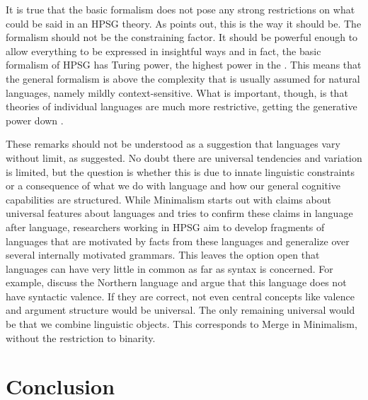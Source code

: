 \documentclass[output=paper
 	        ,biblatex
                ,babelshorthands
                ,newtxmath
                ,draftmode
                ,colorlinks, citecolor=brown
]{langscibook}
\begin{document}
It is true that
the basic formalism does not pose any strong restrictions on what could be said in an HPSG
theory. As \citet{Pollard97a} points out, this is the way it should be. The formalism should not be
the constraining factor. It should be powerful enough to allow everything to be expressed in
insightful ways and in fact, the basic formalism of HPSG has Turing power, the highest power in the
 \citep{Pollard99a}. This means that the general formalism is above the complexity that is usually
assumed for natural languages, namely mildly context-sensitive. What is important, though, is that theories of individual languages are much more
restrictive, getting the generative power down \citep[Chapter~17]{MuellerGT-Eng1}. 

These remarks should not be understood as a suggestion that languages vary without limit, as
\citet[]{Joos58a} suggested. No doubt there are universal tendencies and variation
is limited, but the question is whether this is due to innate linguistic constraints or a
consequence of what we do with language and how our general cognitive capabilities are structured. 
While Minimalism starts out with claims about universal features about languages and tries to
confirm these claims in language after language, researchers working in HPSG aim to develop
fragments of languages that are motivated by facts from these languages and generalize over several
internally motivated grammars. This leaves the option open that languages can have very little in
common as far as syntax is concerned. For example, \citet{KM2012a} discuss the Northern  language  and argue that this language
does not have syntactic valence. If they are correct, not even central concepts like valence and
argument structure would be universal. The only remaining universal would be that we combine
linguistic objects. This corresponds to Merge in Minimalism, without the restriction to binarity.


\section{Conclusion}
\end{document}
